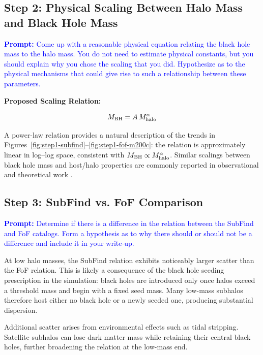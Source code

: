 \documentclass[twocolumn]{aastex631}
\begin{document}
\subsection{Step 2: Physical Scaling Between Halo Mass and Black Hole Mass}
\textcolor{blue}{\textbf{Prompt:} Come up with a reasonable physical equation relating the black hole mass to the halo mass. You do not need to estimate physical constants, but you should explain why you chose the scaling that you
did. Hypothesize as to the physical mechanisms that could give rise to such a relationship between these
parameters.}

\textbf{Proposed Scaling Relation:}

\begin{equation}
M_{\rm BH} = A\, M_{\rm halo}^{\alpha}
\end{equation}

A power-law relation provides a natural description of the trends in Figures~\ref{fig:step1-subfind}--\ref{fig:step1-fof-m200c}: the relation is approximately linear in log--log space, consistent with $M_{\rm BH}\propto M_{\rm halo}^{\alpha}$. Similar scalings between black hole mass and host/halo properties are commonly reported in observational and theoretical work \citep{2002ApJ...578...90F}.





\subsection{Step 3: SubFind vs. FoF Comparison}
\textcolor{blue}{\textbf{Prompt:} Determine if there is a difference in the relation between the SubFind and FoF catalogs. Form a hypothesis as to why there should or should not be a difference and include it in your write-up.}

At low halo masses, the SubFind relation exhibits noticeably larger scatter than the FoF relation. This is likely a consequence of the black hole seeding prescription in the simulation: black holes are introduced only once halos exceed a threshold mass and begin with a fixed seed mass. Many low-mass subhalos therefore host either no black hole or a newly seeded one, producing substantial dispersion.

Additional scatter arises from environmental effects such as tidal stripping. Satellite subhalos can lose dark matter mass while retaining their central black holes, further broadening the relation at the low-mass end.
\end{document}
